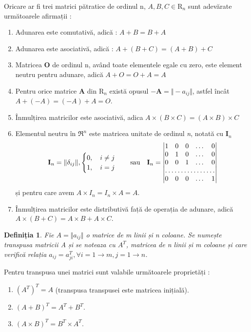 Oricare ar fi trei matrici pătratice de ordinul n, $A, B, C \in \mathrm{R}_{n}$
sunt adevărate următoarele afirmații :
\begin{enumerate}
  \item Adunarea este comutativă, adică : $A + B = B + A$
  \item Adunarea este asociativă, adică : $A + (B + C) = (A + B) + C$
  \item Matricea \textbf{O} de ordinul n, având toate elementele egale cu zero,
  este element neutru pentru adunare, adică $A + O = O + A = A$
  \item Pentru orice matrice \textbf{A} din $\mathrm{R}_n$ există opusul
  $\mathbf{-A} = \Vert -a_{ij} \Vert$, astfel încât $A + (-A) = (-A) + A = O$.
  \item Înmulțirea matricilor este asociativă, adica $A \times (B \times C) =
  (A \times B) \times C$
  \item Elementul neutru în $\mathfrak{R}^n$ este matricea unitate de ordinul
  \textit{n}, notată cu $\mathbf{I}_{n}$
  \[
  \mathbf{I}_{n} = \Vert \delta_{ij} \Vert,
  \begin{cases}
  0, \quad i \neq j \\
  1, \quad i = j
  \end{cases} \quad \text{sau} \quad
  \mathbf{I}_{n} = 
  \begin{vmatrix}
  1 & 0 & 0 & \dots & 0 \\
  0 & 1 & 0 & \dots & 0 \\
  0 & 0 & 1 & \dots & 0 \\
  \hdotsfor{5} \\
  0 & 0 & 0 & \dots & 1
  \end{vmatrix}
  \] și pentru care avem $A \times I_{n} = I_{n} \times A = A$.
  \item Înmulțirea matricilor este distributivă față de operația de adunare,
  adică $A \times (B + C) = A \times B + A \times C$.
\end{enumerate}


\newtheorem{th_transpose}[th_matrixdef]{Definiția}
\begin{th_transpose}
Fie $A = \Vert a_{ij} \Vert$ o matrice de \textit{m} linii și
\textit{n} coloane. Se numește transpusa matricii A și se noteaza cu $A^T$,
matricea de \textit{n} linii și \textit{m} coloane și care verifică relația
$a_{ij} = a^T_{ji}, \forall i = 1 \to m, j = 1 \to n$.
\end{th_transpose}
Pentru transpusa unei matrici sunt valabile următoarele proprietăți :
\begin{enumerate}
  \item $(A^T)^T = A$ (transpusa transpusei este matricea inițială).
  \item $(A + B)^T = A^T + B^T$.
  \item $(A \times B) ^ T = B ^ T \times A ^ T$.
\end{enumerate}

